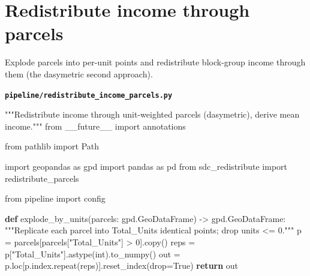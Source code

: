 \documentclass[
  letterpaper,
  DIV=11,
  numbers=noendperiod]{scrreprt}
\newenvironment{Shaded}{\begin{snugshade}}{\end{snugshade}}
\newcommand{\BuiltInTok}[1]{\textcolor[rgb]{0.00,0.23,0.31}{#1}}
\newcommand{\CommentTok}[1]{\textcolor[rgb]{0.37,0.37,0.37}{#1}}
\newcommand{\ControlFlowTok}[1]{\textcolor[rgb]{0.00,0.23,0.31}{\textbf{#1}}}
\newcommand{\DecValTok}[1]{\textcolor[rgb]{0.68,0.00,0.00}{#1}}
\newcommand{\ImportTok}[1]{\textcolor[rgb]{0.00,0.46,0.62}{#1}}
\newcommand{\KeywordTok}[1]{\textcolor[rgb]{0.00,0.23,0.31}{\textbf{#1}}}
\newcommand{\NormalTok}[1]{\textcolor[rgb]{0.00,0.23,0.31}{#1}}
\newcommand{\OperatorTok}[1]{\textcolor[rgb]{0.37,0.37,0.37}{#1}}
\newcommand{\StringTok}[1]{\textcolor[rgb]{0.13,0.47,0.30}{#1}}
\newcommand{\VariableTok}[1]{\textcolor[rgb]{0.07,0.07,0.07}{#1}}
\begin{document}
\section{Redistribute income through
parcels}\label{redistribute-income-through-parcels}

Explode parcels into per-unit points and redistribute block-group income
through them (the dasymetric second approach).

\textbf{\texttt{pipeline/redistribute\_income\_parcels.py}}

\begin{Shaded}
\begin{Highlighting}[]
\CommentTok{"""Redistribute income through unit{-}weighted parcels (dasymetric), derive mean income."""}
\ImportTok{from}\NormalTok{ \_\_future\_\_ }\ImportTok{import}\NormalTok{ annotations}

\ImportTok{from}\NormalTok{ pathlib }\ImportTok{import}\NormalTok{ Path}

\ImportTok{import}\NormalTok{ geopandas }\ImportTok{as}\NormalTok{ gpd}
\ImportTok{import}\NormalTok{ pandas }\ImportTok{as}\NormalTok{ pd}
\ImportTok{from}\NormalTok{ sdc\_redistribute }\ImportTok{import}\NormalTok{ redistribute\_parcels}

\ImportTok{from}\NormalTok{ pipeline }\ImportTok{import}\NormalTok{ config}


\KeywordTok{def}\NormalTok{ explode\_by\_units(parcels: gpd.GeoDataFrame) }\OperatorTok{{-}\textgreater{}}\NormalTok{ gpd.GeoDataFrame:}
    \CommentTok{"""Replicate each parcel into Total\_Units identical points; drop units \textless{}= 0."""}
\NormalTok{    p }\OperatorTok{=}\NormalTok{ parcels[parcels[}\StringTok{"Total\_Units"}\NormalTok{] }\OperatorTok{\textgreater{}} \DecValTok{0}\NormalTok{].copy()}
\NormalTok{    reps }\OperatorTok{=}\NormalTok{ p[}\StringTok{"Total\_Units"}\NormalTok{].astype(}\BuiltInTok{int}\NormalTok{).to\_numpy()}
\NormalTok{    out }\OperatorTok{=}\NormalTok{ p.loc[p.index.repeat(reps)].reset\_index(drop}\OperatorTok{=}\VariableTok{True}\NormalTok{)}
    \ControlFlowTok{return}\NormalTok{ out}



\end{Highlighting}
\end{Shaded}
\end{document}
